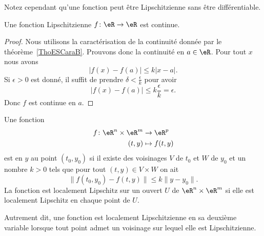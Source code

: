 Notez cependant qu'une fonction peut être Lipschitzienne sans être différentiable.

\begin{proposition} \label{PropFZgFTEW}
    Une fonction Lipschitzienne \( f\colon \eR\to \eR\) est continue.
\end{proposition}

\begin{proof}
    Nous utilisons la caractérisation de la continuité donnée par le théorème~\ref{ThoESCaraB}. Prouvons donc la continuité en \( a\in \eR\). Pour tout \( x\) nous avons
    \begin{equation}
        \big| f(x)-f(a) \big|\leq k| x-a |.
    \end{equation}
    Si \( \epsilon>0\) est donné, il suffit de prendre \( \delta<\frac{ \epsilon }{ k }\) pour avoir
    \begin{equation}
        \big| f(x)-f(a) \big|\leq k\frac{ \epsilon }{ k }=\epsilon.
    \end{equation}
    Donc \( f\) est continue en \( a\).
\end{proof}

\begin{definition}      \label{DefJSFFooEOCogV}
    Une fonction
    \begin{equation}
        \begin{aligned}
            f\colon \eR^n\times \eR^m&\to \eR^p \\
            (t,y)&\mapsto f(t,y)
        \end{aligned}
    \end{equation}
    est  en \( y\) au point \( (t_0,y_0)\) si il existe des voisinages \( V\) de \( t_0\) et \( W\) de \( y_0\) et un nombre \( k>0\) tels que pour tout \( (t,y)\in V\times W\) on ait
    \begin{equation}
        \big\| f(t_0,y_0)-f(t,y) \big\|\leq k\| y-y_0 \|.
    \end{equation}
    La fonction est localement Lipschitz sur un ouvert \( U\) de \( \eR^n\times \eR^m\) si elle est localement Lipschitz en chaque point de \( U\).
\end{definition}

\begin{normaltext}      \label{NORMooYNRAooBgobcK}
    Autrement dit, une fonction est localement Lipschitzienne en sa deuxième variable lorsque tout point admet un voisinage sur lequel elle est Lipschitzienne.
\end{normaltext}

